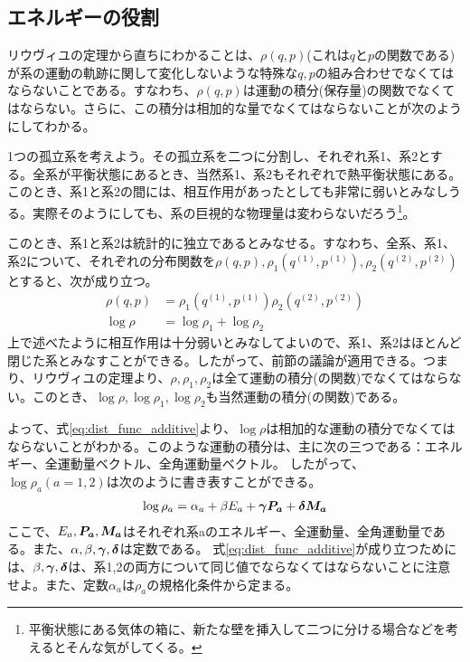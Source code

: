 \documentclass[uplatex,dvipdfmx]{jsarticle}
\begin{document}
    \subsection{エネルギーの役割}
        リウヴィユの定理から直ちにわかることは、$\rho(q,p)$(これは$q$と$p$の関数である)が系の運動の軌跡に関して変化しないような特殊な$q,p$の組み合わせでなくてはならないことである。すなわち、$\rho(q,p)$は運動の積分(保存量)の関数でなくてはならない。さらに、この積分は相加的な量でなくてはならないことが次のようにしてわかる。
    
        1つの孤立系を考えよう。その孤立系を二つに分割し、それぞれ系1、系2とする。全系が平衡状態にあるとき、当然系1、系2もそれぞれで熱平衡状態にある。このとき、系1と系2の間には、相互作用があったとしても非常に弱いとみなしうる。実際そのようにしても、系の巨視的な物理量は変わらないだろう\footnote{平衡状態にある気体の箱に、新たな壁を挿入して二つに分ける場合などを考えるとそんな気がしてくる。}。

        このとき、系1と系2は統計的に独立であるとみなせる。すなわち、全系、系1、系2について、それぞれの分布関数を$\rho(q,p), \rho_1(q^{(1)},p^{(1)}), \rho_2(q^{(2)},p^{(2)})$とすると、次が成り立つ。
        \begin{align}
            \rho(q,p) &= \rho_1(q^{(1)},p^{(1)})\rho_2(q^{(2)},p^{(2)}) \\
            \log \rho &= \log \rho_1 + \log \rho_2 \label{eq:dist_func_additive}
        \end{align}
        上で述べたように相互作用は十分弱いとみなしてよいので、系1、系2はほとんど閉じた系とみなすことができる。したがって、前節の議論が適用できる。つまり、リウヴィユの定理より、$\rho,\rho_1,\rho_2$は全て運動の積分(の関数)でなくてはならない。このとき、$\log\rho,\log\rho_1,\log\rho_2$も当然運動の積分(の関数)である。

        よって、式\eqref{eq:dist_func_additive}より、$\log\rho$は相加的な運動の積分でなくてはならないことがわかる。このような運動の積分は、主に次の三つである：エネルギー、全運動量ベクトル、全角運動量ベクトル。
        したがって、$\log\rho_a (a=1,2)$は次のように書き表すことができる。
        \begin{align}
            \log\rho_a = \alpha_a + \beta E_a + \vb*{\gamma P_a} + \vb*{\delta M_a} \label{eq:canonical_dist1}
        \end{align}
        ここで、$E_a,\vb*{P_a},\vb*{M_a}$はそれぞれ系aのエネルギー、全運動量、全角運動量である。また、$\alpha,\beta,\vb*{\gamma},\vb*{\delta}$は定数である。
        式\eqref{eq:dist_func_additive}が成り立つためには、$\beta, \vb*{\gamma},\vb*{\delta}$は、系1,2の両方について同じ値でならなくてはならないことに注意せよ。また、定数$\alpha_a$は$\rho_a$の規格化条件から定まる。
\end{document}

